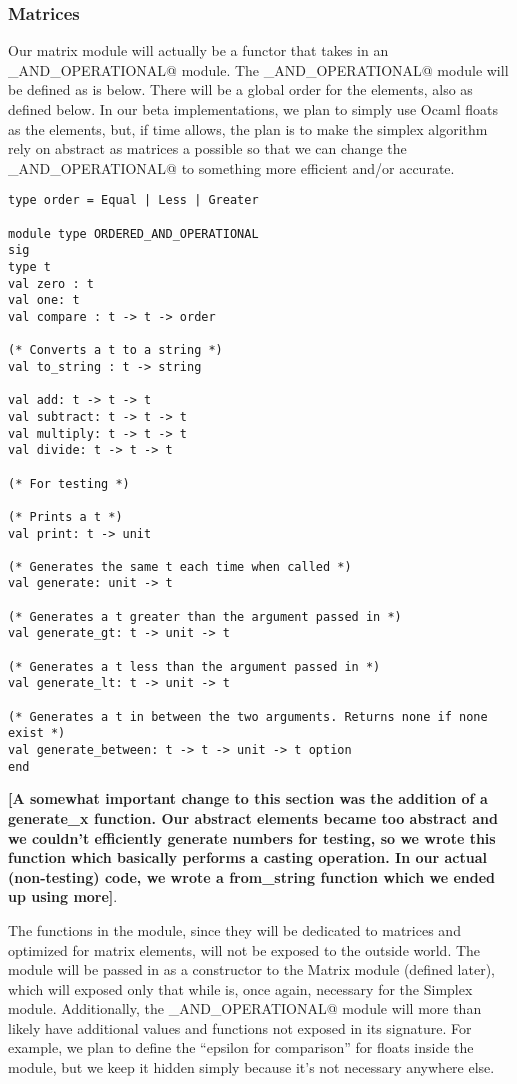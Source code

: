 \documentclass[letterpaper,11pt]{article}
\newcommand{\annot}[1]{\textbf{\color{BrickRed} [#1]}}
\begin{document}
\subsubsection{Matrices}

Our matrix module will actually be a functor that takes in an
\verb@ORDERED_AND_OPERATIONAL@ module. The \verb@ORDERED_AND_OPERATIONAL@ module
will be defined as is below. There will be a global order for the elements, also
as defined below. In our beta implementations, we plan to simply use Ocaml
floats as the elements, but, if time allows, the plan is to make the simplex
algorithm rely on abstract as matrices a possible so that we can change the
\verb@ORDERED_AND_OPERATIONAL@ to something more efficient and/or accurate.

\begin{verbatim}
type order = Equal | Less | Greater

module type ORDERED_AND_OPERATIONAL
sig
type t
val zero : t
val one: t
val compare : t -> t -> order

(* Converts a t to a string *)
val to_string : t -> string

val add: t -> t -> t
val subtract: t -> t -> t
val multiply: t -> t -> t
val divide: t -> t -> t

(* For testing *)

(* Prints a t *)
val print: t -> unit

(* Generates the same t each time when called *)
val generate: unit -> t

(* Generates a t greater than the argument passed in *)
val generate_gt: t -> unit -> t

(* Generates a t less than the argument passed in *)
val generate_lt: t -> unit -> t

(* Generates a t in between the two arguments. Returns none if none exist *)
val generate_between: t -> t -> unit -> t option
end
\end{verbatim}

{\annot{A somewhat important change to this section was the addition of a 
generate\_x function. Our abstract elements became too abstract and we
couldn't efficiently generate numbers for testing, so we wrote this function which
basically performs a casting operation. In our actual (non-testing) code, we
wrote a from\_string function which we ended up using more}}.

The functions in the module, since they will be dedicated to matrices and
optimized for matrix elements, will not be exposed to the outside world. The
module will be passed in as a constructor to the Matrix module (defined later),
which will exposed only that while is, once again, necessary for the Simplex
module. Additionally, the \verb@ORDERED_AND_OPERATIONAL@ module will more than
likely have additional values and functions not exposed in its signature. For
example, we plan to define the “epsilon for comparison” for floats inside the
module, but we keep it hidden simply because it's not necessary anywhere else.
\end{document}
